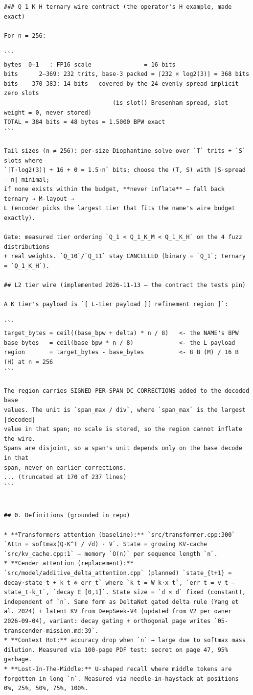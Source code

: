 \begin{Verbatim}[breaklines,breakanywhere,fontsize=\footnotesize]
### Q_1_K_H ternary wire contract (the operator's H example, made exact)

For n = 256:

```
bytes  0–1   : FP16 scale               = 16 bits
bits      2–369: 232 trits, base-3 packed = ⌈232 × log2(3)⌉ = 368 bits
bits    370–383: 14 bits — covered by the 24 evenly-spread implicit-zero slots
                               (is_slot() Bresenham spread, slot weight = 0, never stored)
TOTAL = 384 bits = 48 bytes = 1.5000 BPW exact
```

Tail sizes (n ≠ 256): per-size Diophantine solve over `T` trits + `S` slots where
`⌈T·log2(3)⌉ + 16 + 0 = 1.5·n` bits; choose the (T, S) with |S·spread − n| minimal;
if none exists within the budget, **never inflate** — fall back ternary → M-layout →
L (encoder picks the largest tier that fits the name's wire budget exactly).

Gate: measured tier ordering `Q_1 < Q_1_K_M < Q_1_K_H` on the 4 fuzz distributions
+ real weights. `Q_10`/`Q_11` stay CANCELLED (binary = `Q_1`; ternary = `Q_1_K_H`).

## L2 tier wire (implemented 2026-11-13 — the contract the tests pin)

A K tier's payload is `[ L-tier payload ][ refinement region ]`:

```
target_bytes = ceil((base_bpw + delta) * n / 8)   <- the NAME's BPW
base_bytes   = ceil(base_bpw * n / 8)             <- the L payload
region       = target_bytes - base_bytes          <- 8 B (M) / 16 B (H) at n = 256
```

The region carries SIGNED PER-SPAN DC CORRECTIONS added to the decoded base
values. The unit is `span_max / div`, where `span_max` is the largest |decoded|
value in that span; no scale is stored, so the region cannot inflate the wire.
Spans are disjoint, so a span's unit depends only on the base decode in that
span, never on earlier corrections.
... (truncated at 170 of 237 lines)
```


## 0. Definitions (grounded in repo)

* **Transformers attention (baseline):** `src/transformer.cpp:300` `Attn = softmax(Q·K^T / √d) · V`. State = growing KV-cache `src/kv_cache.cpp:1` — memory `O(n)` per sequence length `n`.
* **Cender attention (replacement):** `src/model/additive_delta_attention.cpp` (planned) `state_{t+1} = decay·state_t + k_t ⊗ err_t` where `k_t = W_k·x_t`, `err_t = v_t - state_t·k_t`, `decay ∈ [0,1]`. State size = `d × d` fixed (constant), independent of `n`. Same form as DeltaNet gated delta rule (Yang et al. 2024) + latent KV from DeepSeek-V4 (updated from V2 per owner 2026-09-04), variant: decay gating + orthogonal page writes `05-transcender-mission.md:39`.
* **Context Rot:** accuracy drop when `n` → large due to softmax mass dilution. Measured via 100-page PDF test: secret on page 47, 95% garbage.
* **Lost-In-The-Middle:** U-shaped recall where middle tokens are forgotten in long `n`. Measured via needle-in-haystack at positions 0%, 25%, 50%, 75%, 100%.


\end{Verbatim}
